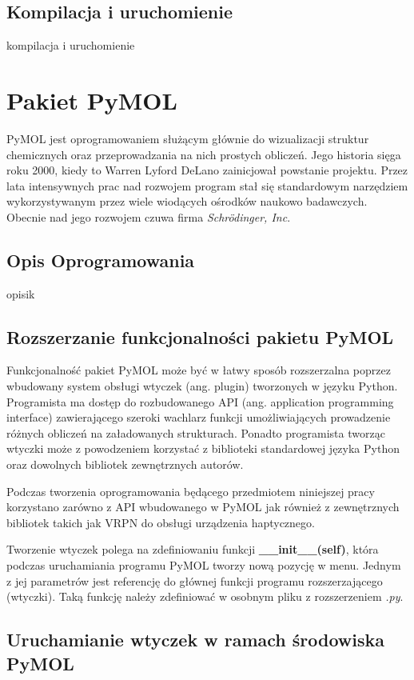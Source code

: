 \documentclass[licencjacka]{pracamgr}
\begin{document}
\section{Kompilacja i uruchomienie}
kompilacja i uruchomienie

\chapter{Pakiet PyMOL}
PyMOL jest oprogramowaniem służącym głównie do wizualizacji struktur chemicznych oraz przeprowadzania na nich prostych obliczeń. Jego historia sięga roku 2000, kiedy to Warren Lyford DeLano zainicjował powstanie projektu. Przez lata intensywnych prac nad rozwojem program stał się standardowym narzędziem wykorzystywanym przez wiele wiodących ośrodków naukowo badawczych. Obecnie nad jego rozwojem czuwa firma \textit{Schrödinger, Inc}.

\section{Opis Oprogramowania}
opisik

\section{Rozszerzanie funkcjonalności pakietu PyMOL}
Funkcjonalność pakiet PyMOL może być w łatwy sposób rozszerzalna poprzez wbudowany system obsługi wtyczek (ang. plugin) tworzonych w języku Python. Programista ma dostęp do rozbudowanego API (ang. application programming interface) zawierającego szeroki wachlarz funkcji umożliwiających prowadzenie różnych obliczeń na załadowanych strukturach. Ponadto programista tworząc wtyczki może z powodzeniem korzystać z biblioteki standardowej języka Python oraz dowolnych bibliotek zewnętrznych autorów.

Podczas tworzenia oprogramowania będącego przedmiotem niniejszej pracy korzystano zarówno z API wbudowanego w PyMOL jak również z zewnętrznych bibliotek takich jak VRPN do obsługi urządzenia haptycznego.

Tworzenie wtyczek polega na zdefiniowaniu funkcji \textbf{\_\_init\_\_(self)}, która podczas uruchamiania programu PyMOL tworzy nową pozycję w menu. Jednym z jej parametrów jest referencję do głównej funkcji programu rozszerzającego (wtyczki). Taką funkcję należy zdefiniować w osobnym pliku z rozszerzeniem \textit{.py}.

\section{Uruchamianie wtyczek w ramach środowiska PyMOL}
\end{document}
